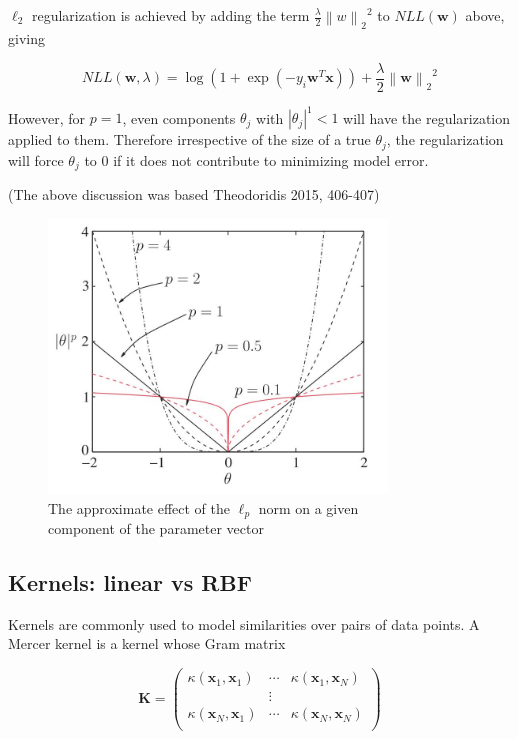 \documentclass[letterpaper, 11pt]{article}
\newcommand{\norm}[1]{\left\lVert #1 \right\rVert}
\newcommand{\vect}[1]{\boldsymbol{#1}}
\begin{document}
$\ell_2$ regularization is achieved by adding the term $\frac{\lambda}{2} {\norm{w}_2}^2$ to $NLL(\vect{w})$ above, giving

\begin{equation*}
  NLL(\vect{w}, \lambda) = \log(1 + \exp(-y_i \vect{w}^T\vect{x})) + \frac{\lambda}{2} {\norm{\vect{w}}_2}^2
\end{equation*}

However, for $p = 1$, even components $\theta_j$ with $|\theta_j|^1 < 1$ will have the regularization applied to them. Therefore irrespective of the size of a true $\theta_j$, the regularization will force $\theta_j$ to 0 if it does not contribute to minimizing model error.

(The above discussion was based Theodoridis 2015, 406-407)

\begin{figure}[ht!]
\centering
\includegraphics[width=90mm]{figure1.jpg}
\caption{The approximate effect of the $\ell_p$ norm on a given\\ component of the parameter vector \label{overflow}}
\end{figure}

\subsection{Kernels: linear vs RBF}

Kernels are commonly used to model similarities over pairs of data points. A Mercer kernel is a kernel whose Gram matrix

\begin{equation*}
  \vect{K} = \begin{pmatrix}
    \kappa(\vect{x}_1, \vect{x}_1) & \cdots & \kappa(\vect{x}_1, \vect{x}_N) \\
    & \vdots & \\
    \kappa(\vect{x}_N, \vect{x}_1) & \cdots & \kappa(\vect{x}_N, \vect{x}_N) \\    
  \end{pmatrix}
\end{equation*}
\end{document}
